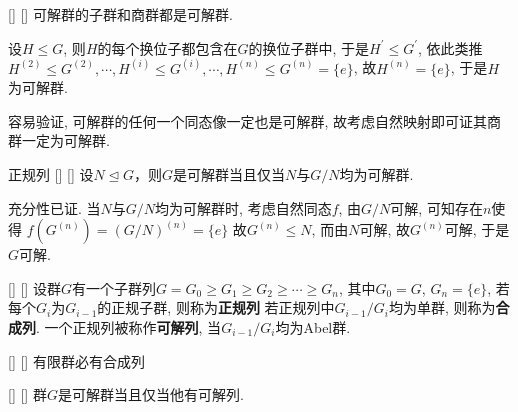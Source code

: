 \documentclass[UTF8]{ctexart}
\begin{document}
            \begin{ppt}
            []
            {}
            []
            []
                可解群的子群和商群都是可解群. 
           \end{ppt}

            \begin{prf}
                设$H\leq G$, 则$H$的每个换位子都包含在$G$的换位子群中, 于是$H^\prime\leq G^\prime$,
                依此类推$H^{(2)}\leq G^{(2)},\cdots,H^{(i)}\leq G^{(i)},
                \cdots,H^{(n)}\leq G^{(n)}=\{e\}$, 故$H^{(n)}=\{e\}$, 于是$H$为可解群.

                容易验证, 可解群的任何一个同态像一定也是可解群, 故考虑自然映射即可证其商群一定为可解群.
            \end{prf}   

            \begin{ppt}
            []
            {正规列}
            []
            []
                设$N\trianglelefteq G$，则$G$是可解群当且仅当$N$与$G/N$均为可解群.
            \end{ppt}

            \begin{prf}
                充分性已证. 当$N$与$G/N$均为可解群时, 考虑自然同态$f$, 由$G/N$可解, 可知存在$n$使得
                $f(G^{(n)})=(G/N)^{(n)}=\{e\}$
                故$G^{(n)}\leq N$, 而由$N$可解, 故$G^{(n)}$可解, 于是$G$可解.
            \end{prf}

            \begin{dfn}
            []
            {}
            []
            []
                设群$G$有一个子群列$G=G_0\geq G_1\geq G_2\geq\cdots\geq G_n$, 其中$G_0=G$, 
                $G_n=\{e\}$, 若每个$G_i$为$G_{i-1}$的正规子群, 则称为\textbf{正规列}
                若正规列中$G_{i-1}/G_{i}$均为单群, 则称为\textbf{合成列}. 
                一个正规列被称作\textbf{可解列}, 当$G_{i-1}/G_{i}$均为Abel群.
           \end{dfn}

            \begin{thm}
            []
            {}
            []
            []
                有限群必有合成列
           \end{thm}

            \begin{thm}
            []
            {}
            []
            []
                群$G$是可解群当且仅当他有可解列.
           \end{thm}
\end{document}
